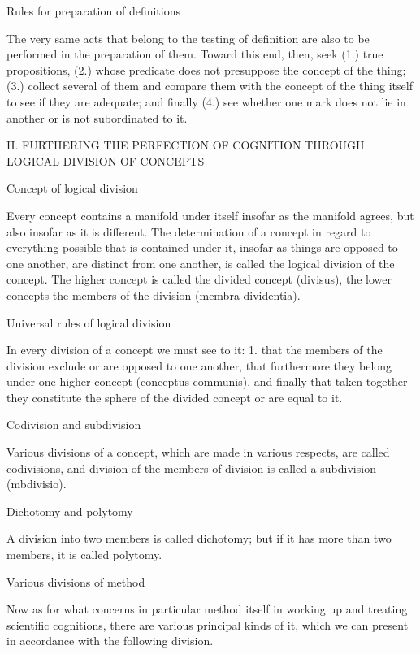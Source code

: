     Rules for preparation of definitions

    The very same acts that belong to the testing of definition are also to be
    performed in the preparation of them.
    Toward this end, then, seek
    (1.) true propositions,
    (2.) whose predicate does not presuppose the concept of the thing;
    (3.) collect several of them and compare them with the concept of
    the thing itself to see if they are adequate; and finally
    (4.) see whether one mark does not lie in another or is not subordinated to it.

    II. FURTHERING THE PERFECTION OF COGNITION
    THROUGH LOGICAL DIVISION OF CONCEPTS

    Concept of logical division

    Every concept contains a manifold under itself insofar as the manifold agrees,
    but also insofar as it is different.
    The determination of a concept in regard to everything possible
    that is contained under it, insofar as things are opposed to one another,
    are distinct from one another, is called the logical division of the concept.
    The higher concept is called the divided concept (divisus),
    the lower concepts the members of the division (membra dividentia).

    Universal rules of logical division

    In every division of a concept we must see to it:
    1. that the members of the division exclude or are opposed to one another,
    that furthermore they belong under one higher concept (conceptus communis),
    and finally that taken together they constitute the sphere of
    the divided concept or are equal to it.

    Codivision and subdivision

    Various divisions of a concept, which are made in various respects, are
    called codivisions, and division of the members of division is called a
    subdivision (mbdivisio).

    Dichotomy and polytomy

    A division into two members is called dichotomy; but if it has more than two
    members, it is called polytomy.

    Various divisions of method

    Now as for what concerns in particular method itself in working up and
    treating scientific cognitions, there are various principal kinds of it,
    which we can present in accordance with the following division.

